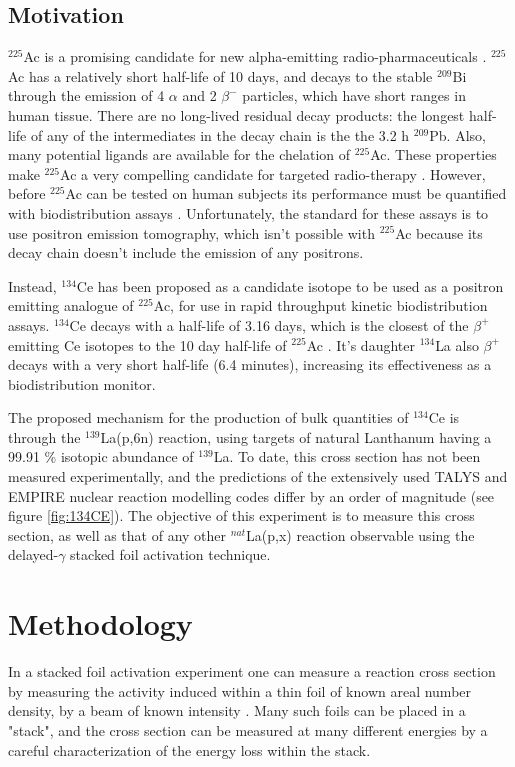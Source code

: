 \documentclass[aps,superscriptaddress,twocolumn,secnumarabic,balancelastpage,amsmath,amssymb,nofootinbib,floatfix]{revtex4-1}
\begin{document}
\subsection{Motivation}
$^{225}$Ac is a promising candidate for new alpha-emitting radio-pharmaceuticals \cite{BOLL2005667}.  $^{225}$Ac has a relatively short half-life of 10 days, and decays to the stable $^{209}$Bi through the emission of 4 $\alpha$ and 2 $\beta^-$ particles, which have short ranges in human tissue. There are no long-lived residual decay products: the longest half-life of any of the intermediates in the decay chain is the the 3.2 h $^{209}$Pb.  Also, many potential ligands are available for the chelation of $^{225}$Ac.  These properties make $^{225}$Ac a very compelling candidate for targeted radio-therapy \cite{BOLL2005667}.  However, before $^{225}$Ac can be tested on human subjects its performance must be quantified with biodistribution assays \cite{doi:10.1021/ac0580114}.  Unfortunately, the standard for these assays is to use positron emission tomography, which isn't possible with $^{225}$Ac because its decay chain doesn't include the emission of any positrons.

Instead, $^{134}$Ce has been proposed as a candidate isotope to be used as a positron emitting analogue of $^{225}$Ac, for use in rapid throughput kinetic biodistribution assays.  $^{134}$Ce decays with a half-life of 3.16 days, which is the closest of the $\beta^+$ emitting Ce isotopes to the 10 day half-life of $^{225}$Ac \cite{ensdf}.  It's daughter $^{134}$La also $\beta^+$ decays with a very short half-life (6.4 minutes), increasing its effectiveness as a biodistribution monitor.  

The proposed mechanism for the production of bulk quantities of $^{134}$Ce is through the $^{139}$La(p,6n) reaction, using targets of natural Lanthanum having a 99.91 \% isotopic abundance of $^{139}$La.  To date, this cross section has not been measured experimentally, and the predictions of the extensively used TALYS \cite{TALYS} and EMPIRE \cite{HERMAN20072655} nuclear reaction modelling codes differ by an order of magnitude (see figure \ref{fig:134CE}).  The objective of this experiment is to measure this cross section, as well as that of any other $^{nat}$La(p,x) reaction observable using the delayed-$\gamma$ stacked foil activation technique.


\section{Methodology}
In a stacked foil activation experiment one can measure a reaction cross section by measuring the activity induced within a thin foil of known areal number density, by a beam of known intensity \cite{GRAVES201644}.  Many such foils can be placed in a "stack", and the cross section can be measured at many different energies by a careful characterization of the energy loss within the stack.
\end{document}
